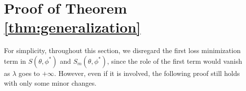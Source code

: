 %
%
%

\section{Proof of Theorem \ref{thm:generalization}}\label{sec:gen_proof}
For simplicity, throughout this section, we disregard the first loss minimization term in $S(\theta,\phi^*)$ and $S_m(\theta,\phi^*)$, since the role of the first term would vanish as $\lambda$ goes to $+\infty$. However, even if it is involved, the following proof still holds with only some minor changes.



